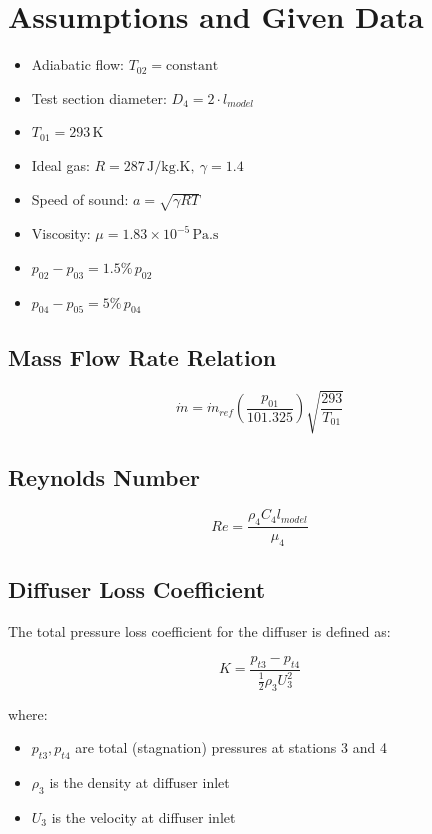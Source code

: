 \documentclass[12pt]{article}
\begin{document}

\section*{Assumptions and Given Data}

\begin{itemize}
    \item Adiabatic flow: \( T_{02} = \text{constant} \)
    \item Test section diameter: \( D_4 = 2 \cdot l_{model} \)
    \item \( T_{01} = 293\,\text{K} \)
    \item Ideal gas: \( R = 287\,\text{J/kg.K},\ \gamma = 1.4 \)
    \item Speed of sound: \( a = \sqrt{\gamma R T} \)
    \item Viscosity: \( \mu = 1.83 \times 10^{-5} \,\text{Pa.s} \)
    \item \( p_{02} - p_{03} = 1.5\% \, p_{02} \)
    \item \( p_{04} - p_{05} = 5\% \, p_{04} \)
\end{itemize}

\subsection*{Mass Flow Rate Relation}
\[
\dot{m} = \dot{m}_{ref} \left( \frac{p_{01}}{101.325} \right)\sqrt{\frac{293}{T_{01}}}
\]

\subsection*{Reynolds Number}
\[
Re = \frac{\rho_4 C_4 l_{model}}{\mu_4}
\]

\subsection*{Diffuser Loss Coefficient}

The total pressure loss coefficient for the diffuser is defined as:

\[
K = \frac{p_{t3} - p_{t4}}{\frac{1}{2}\rho_3 U_3^2}
\]

where:
\begin{itemize}
    \item \( p_{t3}, p_{t4} \) are total (stagnation) pressures at stations 3 and 4
    \item \( \rho_3 \) is the density at diffuser inlet
    \item \( U_3 \) is the velocity at diffuser inlet
\end{itemize}
\end{document}
